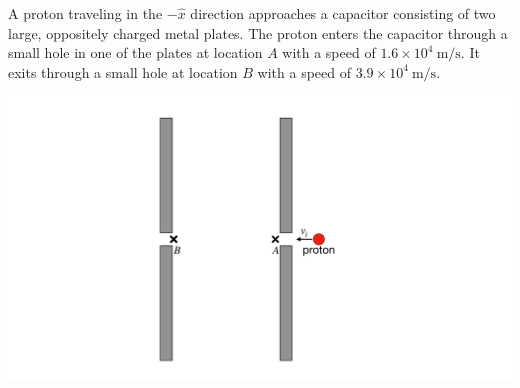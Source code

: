 \question A proton traveling in the $-\hat{x}$ direction approaches a capacitor consisting of two large, oppositely charged metal plates. The proton enters the capacitor through a small hole in one of the plates at location $A$ with a speed of $1.6\times10^4\ \mathrm{m/s}$. It exits through a small hole at location $B$ with a speed of $3.9\times10^4\ \mathrm{m/s}$.

\begin{center}
	\includegraphics[width=.4\textwidth]{ch16exam.pdf}
\end{center}

